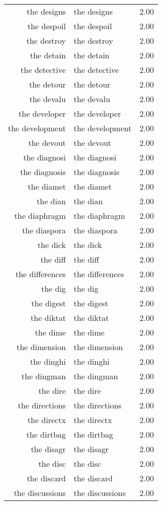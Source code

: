 \begin{table}[ht]
\begin{tabular}{rlr}
  the designs & the designs & 2.00 \\ 
  the despoil & the despoil & 2.00 \\ 
  the destroy & the destroy & 2.00 \\ 
  the detain & the detain & 2.00 \\ 
  the detective & the detective & 2.00 \\ 
  the detour & the detour & 2.00 \\ 
  the devalu & the devalu & 2.00 \\ 
  the developer & the developer & 2.00 \\ 
  the development & the development & 2.00 \\ 
  the devout & the devout & 2.00 \\ 
  the diagnosi & the diagnosi & 2.00 \\ 
  the diagnosis & the diagnosis & 2.00 \\ 
  the diamet & the diamet & 2.00 \\ 
  the dian & the dian & 2.00 \\ 
  the diaphragm & the diaphragm & 2.00 \\ 
  the diaspora & the diaspora & 2.00 \\ 
  the dick & the dick & 2.00 \\ 
  the diff & the diff & 2.00 \\ 
  the differences & the differences & 2.00 \\ 
  the dig & the dig & 2.00 \\ 
  the digest & the digest & 2.00 \\ 
  the diktat & the diktat & 2.00 \\ 
  the dime & the dime & 2.00 \\ 
  the dimension & the dimension & 2.00 \\ 
  the dinghi & the dinghi & 2.00 \\ 
  the dingman & the dingman & 2.00 \\ 
  the dire & the dire & 2.00 \\ 
  the directions & the directions & 2.00 \\ 
  the directx & the directx & 2.00 \\ 
  the dirtbag & the dirtbag & 2.00 \\ 
  the disagr & the disagr & 2.00 \\ 
  the disc & the disc & 2.00 \\ 
  the discard & the discard & 2.00 \\ 
  the discussions & the discussions & 2.00 \\ 

\end{tabular}
\end{table}
